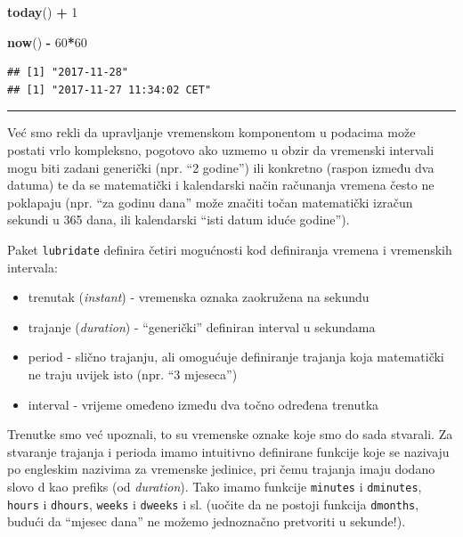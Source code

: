 \documentclass[]{book}
\newenvironment{Shaded}{\begin{snugshade}}{\end{snugshade}}
\newcommand{\KeywordTok}[1]{\textcolor[rgb]{0.13,0.29,0.53}{\textbf{#1}}}
\newcommand{\DecValTok}[1]{\textcolor[rgb]{0.00,0.00,0.81}{#1}}
\newcommand{\StringTok}[1]{\textcolor[rgb]{0.31,0.60,0.02}{#1}}
\newcommand{\OperatorTok}[1]{\textcolor[rgb]{0.81,0.36,0.00}{\textbf{#1}}}
\newcommand{\NormalTok}[1]{#1}
\providecommand{\tightlist}{%
  \setlength{\itemsep}{0pt}\setlength{\parskip}{0pt}}
\theoremstyle{definition}
\theoremstyle{definition}
\theoremstyle{definition}
\theoremstyle{remark}
\begin{document}
\begin{Shaded}
\begin{Highlighting}[]
\KeywordTok{today}\NormalTok{() }\OperatorTok{+}\StringTok{ }\DecValTok{1}

\KeywordTok{now}\NormalTok{() }\OperatorTok{-}\StringTok{ }\DecValTok{60}\OperatorTok{*}\DecValTok{60}
\end{Highlighting}
\end{Shaded}

\begin{verbatim}
## [1] "2017-11-28"
## [1] "2017-11-27 11:34:02 CET"
\end{verbatim}

\begin{center}\rule{0.5\linewidth}{\linethickness}\end{center}

Već smo rekli da upravljanje vremenskom komponentom u podacima može
postati vrlo kompleksno, pogotovo ako uzmemo u obzir da vremenski
intervali mogu biti zadani generički (npr. ``2 godine'') ili konkretno
(raspon između dva datuma) te da se matematički i kalendarski način
računanja vremena često ne poklapaju (npr. ``za godinu dana'' može
značiti točan matematički izračun sekundi u 365 dana, ili kalendarski
``isti datum iduće godine'').

Paket \texttt{lubridate} definira četiri mogućnosti kod definiranja
vremena i vremenskih intervala:

\begin{itemize}
\tightlist
\item
  trenutak (\emph{instant}) - vremenska oznaka zaokružena na sekundu
\item
  trajanje (\emph{duration}) - ``generički'' definiran interval u
  sekundama
\item
  period - slično trajanju, ali omogućuje definiranje trajanja koja
  matematički ne traju uvijek isto (npr. ``3 mjeseca'')
\item
  interval - vrijeme omeđeno između dva točno određena trenutka
\end{itemize}

Trenutke smo već upoznali, to su vremenske oznake koje smo do sada
stvarali. Za stvaranje trajanja i perioda imamo intuitivno definirane
funkcije koje se nazivaju po engleskim nazivima za vremenske jedinice,
pri čemu trajanja imaju dodano slovo d kao prefiks (od \emph{duration}).
Tako imamo funkcije \texttt{minutes} i \texttt{dminutes}, \texttt{hours}
i \texttt{dhours}, \texttt{weeks} i \texttt{dweeks} i sl. (uočite da ne
postoji funkcija \texttt{dmonths}, budući da ``mjesec dana'' ne možemo
jednoznačno pretvoriti u sekunde!).
\end{document}

